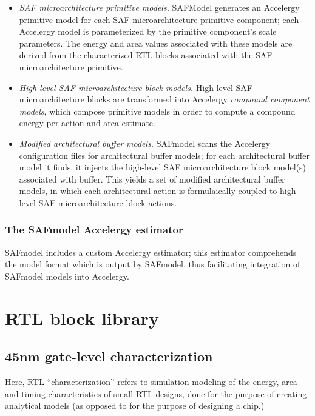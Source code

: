 \begin{itemize}
    \item \textit{SAF microarchitecture primitive models.} SAFModel generates an Accelergy primitive model for each SAF microarchitecture primitive component; each Accelergy model is parameterized by the primitive component's scale parameters. The energy and area values associated with these models are derived from the characterized RTL blocks associated with the SAF microarchitecture primitive.
    \item \textit{High-level SAF microarchitecture block models.} High-level SAF microarchitecture blocks are transformed into Accelergy \textit{compound component models}\cite{accelergy}, which compose primitive models in order to compute a compound energy-per-action and area estimate.
    \item \textit{Modified architectural buffer models.} SAFmodel scans the Accelergy configuration files for architectural buffer models; for each architectural buffer model it finds, it injects the high-level SAF microarchitecture block model(s) associated with buffer. This yields a set of modified architectural buffer models, in which each architectural action is formulaically coupled to high-level SAF microarchitecture block actions.
\end{itemize}

\subsubsection{The SAFmodel Accelergy estimator}

SAFmodel includes a custom Accelergy estimator\cite{accelergy}; this estimator comprehends the model format which is output by SAFmodel, thus facilitating integration of SAFmodel models into Accelergy.

\section{RTL block library}


\subsection{45nm gate-level characterization}

Here, RTL ``characterization'' refers to simulation-modeling of the energy, area and timing-characteristics of small RTL designs, done for the purpose of creating analytical models (as opposed to for the purpose of designing a chip.)

